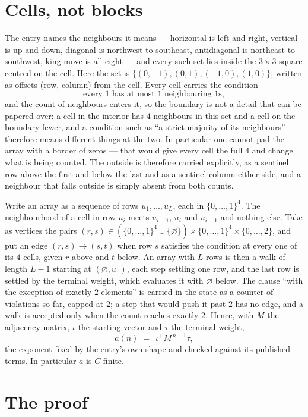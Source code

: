 \documentclass[11pt,a4paper]{article}
\theoremstyle{plain}
\theoremstyle{definition}
\begin{document}
\section{Cells, not blocks}

The entry names the neighbours it means --- horizontal is left and right, vertical is up and
down, diagonal is northwest-to-southeast, antidiagonal is northeast-to-southwest, king-move is
all eight --- and every such set lies inside the $3\times3$ square centred on the cell. Here
the set is $\{(0,-1), (0,1), (-1,0), (1,0)\}$, written as offsets (row, column) from the cell. Every cell carries
the condition
\[
\text{every 1 has at most 1 neighbouring 1s},
\]
and the count of neighbours enters it, so the boundary is not a detail that can be papered
over: a cell in the interior has $4$ neighbours in this set and a cell on the boundary
fewer, and a condition such as ``a strict majority of its neighbours'' therefore means
different things at the two. In particular one cannot pad the array with a border of zeros ---
that would give every cell the full $4$ and change what is being counted. The outside is
therefore carried
explicitly, as a sentinel row above the first and below the last and as a sentinel column
either side, and a neighbour that falls outside is simply absent from both counts.

Write an array as a sequence of rows $u_1,\dots,u_L$, each in
$\{0,\dots,1\}^{4}$. The neighbourhood of a cell in row $u_i$ meets $u_{i-1}$,
$u_i$ and $u_{i+1}$ and nothing else. Take as vertices the pairs
$(r,s)\in(\{0,\dots,1\}^{4}\cup\{\varnothing\})\times\{0,\dots,1\}^{4} \times \{0,\dots,2\}$,
and put an edge $(r,s)\to(s,t)$ when row $s$ satisfies the condition at every one of its
$4$ cells, given $r$ above and $t$ below. An array with $L$ rows is then a walk of length
$L-1$ starting at $(\varnothing,u_1)$, each step settling one row, and the last row is
settled by the terminal weight, which evaluates it with $\varnothing$ below. The clause ``with the exception of exactly $2$ elements'' is carried in
the state as a counter of violations so far, capped at $2$; a step that would push it past
$2$ has no edge, and a walk is accepted only when the count reaches exactly $2$. Hence,
with $M$ the adjacency matrix, $\iota$ the starting vector and $\tau$ the terminal weight,
\[
a(n)\;=\;\,\iota^{\!\top}M^{\,n-1}\tau ,
\]
the exponent fixed by the entry's own shape and checked against its published terms. In
particular $a$ is $C$-finite.

\section{The proof}
\end{document}
